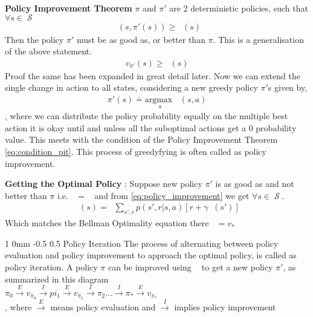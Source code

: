 \documentclass[twocolumn,11pt]{article}
\makeatletter
\DeclareMathOperator{\state}{\mathcal{S}}
\DeclareMathOperator{\qp}{q_\pi} %
\DeclareMathOperator{\vp}{v_\pi} %
\DeclareMathOperator{\vpd}{v_{\pi'}}
\DeclareMathOperator{\maxa}{\underset{a}{\text{max }}}
\renewcommand{\subsection}{\@startsection
{subsection}%
{1}%
{0mm}%
{-0.5\baselineskip}%
{0.5\baselineskip}%
{\bfseries\color{blue}}} %
\makeatother
\begin{document}
\textbf{Policy Improvement Theorem } $\pi$ and $\pi'$ are 2 deterministic policies, such that $\forall s \in \state$\useshortskip
\begin{align} \label{eq:condition_pit}
	\qp(s, \pi'(s)) \geq \vp(s)
\end{align}
Then the policy $\pi'$ must be as good as, or better than $\pi$. This is a generalisation of the above statement.\useshortskip
\begin{align}
	v_{\pi'}(s) \geq \vp(s)
\end{align}
Proof the same has been expanded in great detail later. Now we can extend the single change in action to all states, considering a new greedy policy $\pi'$s given  by, 
\begin{align}\label{eq:policy_improvement}
	\pi'(s)  \doteq  \underset{a}{\text{argmax }} \qp(s,a)
\end{align} ,
where we  can distribute the policy probability equally on the multiple best action it is okay until and unless all the suboptimal actions get a 0 probability value. This meets with the condition of  the Policy Improvement Theorem \ref{eq:condition_pit}. This process of greedyfying is often called as policy improvement.

\textbf{Getting the Optimal Policy} : Suppose new  policy $\pi'$ is as good as and not better than $\pi$ i.e. $\vp = \vpd$ and from \ref{eq:policy_improvement}  we get  $\forall s \in \state$. \useshortskip
\begin{align*}
	\vpd(s) = \maxa \sum_{s',r} p(s',r|s,a) [r + \gamma \vpd(s')]
\end{align*}
Which matches the Bellman Optimality equation there $\vpd = v_*$

\subsection{Policy Iteration}
The process of alternating between policy evaluation and policy improvement to approach the optimal policy, is called as policy iteration. A policy $\pi$ can be improved using $\vp$ to get a new policy $\pi'$, as summarized in this diagram\\
$\pi_0 \overset{E}{\rightarrow} v_{\pi_0} \overset{I}{\rightarrow} pi_1 \overset{E}{\rightarrow} v_{\pi_1} \overset{I}{\rightarrow} \pi_2 \ldots \overset{I}{\rightarrow} \pi_* \overset{E}{\rightarrow} v_{\pi_*}  $\\, where $\overset{E}{\rightarrow}$ means policy  evaluation and $ \overset{I}{\rightarrow} $ implies policy improvement
\end{document}
